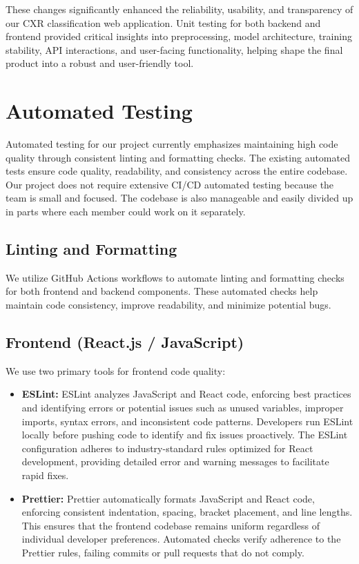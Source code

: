 \documentclass[12pt, titlepage]{article}
\begin{document}
These changes significantly enhanced the reliability, usability, and transparency of our CXR classification web application. Unit testing for both backend and frontend provided critical insights into preprocessing, model architecture, training stability, API interactions, and user-facing functionality, helping shape the final product into a robust and user-friendly tool.


\section{Automated Testing}
Automated testing for our project currently emphasizes maintaining high code quality through consistent linting and formatting checks. The existing automated tests ensure code quality, readability, and consistency across the entire codebase. Our project does not require extensive CI/CD automated testing because the team is small and focused. The codebase is also manageable and easily divided up in parts where each member could work on it separately.

\subsection{Linting and Formatting}

We utilize GitHub Actions workflows to automate linting and formatting checks for both frontend and backend components. These automated checks help maintain code consistency, improve readability, and minimize potential bugs.

\subsection{Frontend (React.js / JavaScript)}

We use two primary tools for frontend code quality:
\begin{itemize}
\item \textbf{ESLint:} ESLint analyzes JavaScript and React code, enforcing best practices and identifying errors or potential issues such as unused variables, improper imports, syntax errors, and inconsistent code patterns. Developers run ESLint locally before pushing code to identify and fix issues proactively. The ESLint configuration adheres to industry-standard rules optimized for React development, providing detailed error and warning messages to facilitate rapid fixes.
\item \textbf{Prettier:} Prettier automatically formats JavaScript and React code, enforcing consistent indentation, spacing, bracket placement, and line lengths. This ensures that the frontend codebase remains uniform regardless of individual developer preferences. Automated checks verify adherence to the Prettier rules, failing commits or pull requests that do not comply.
\end{itemize}
\end{document}
